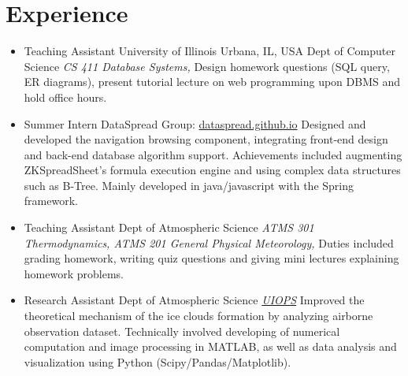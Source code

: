 \documentclass[11pt,a4paper,sans]{moderncv}        %
\begin{document}
\section{Experience}
\vspace{6pt}
\begin{itemize}
	
	\item{
	      {Teaching Assistant}
	      {University of Illinois}
	      {Urbana, IL, USA}
	      {Dept of Computer Science}
	      {\emph{CS 411 Database Systems,} Design homework questions (SQL query, ER diagrams), present tutorial lecture on web programming upon DBMS and hold office hours.}
	      }
	      
	\item{
	      {Summer Intern}
	      {\vspace{-10pt}}
	      {}
	      {DataSpread Group: \href{https://dataspread.github.io}{\faExternalLink dataspread.github.io}}
	      {\href{https://github.com/dataspread/dataspread-web}{\faGithub} Designed and developed the navigation browsing component, integrating front-end design and back-end database algorithm support. Achievements included augmenting ZKSpreadSheet's formula execution engine and using complex data structures such as B-Tree. Mainly developed in java/javascript with the Spring framework.}
	      }
	      
	\item{
	      {Teaching Assistant}
	      {\vspace{-10pt}}
	      {}
	      {Dept of Atmospheric Science}
	      {\emph{ATMS 301 Thermodynamics, ATMS 201 General Physical Meteorology,} Duties included grading homework, writing quiz questions and giving mini lectures explaining homework problems.}
	      }
	      
	\item{
	      {Research Assistant}
	      {\vspace{-10pt}}
	      {}
	      {Dept of Atmospheric Science}
	      {\href{https://github.com/joefinlon/UIOPS}{\emph{UIOPS}} Improved the theoretical mechanism of the ice clouds formation by analyzing airborne observation dataset. Technically involved developing of numerical computation and image processing in MATLAB, as well as data analysis and visualization using Python (Scipy/Pandas/Matplotlib).}
	      }
	      

\end{itemize}
\end{document}
